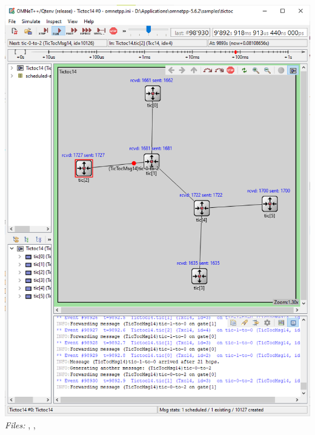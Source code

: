 \documentclass[conference]{IEEEtran}
\begin{document}
\includegraphics[scale=0.23]{images/tictoc14.ned.png}\break
\textit{Files:} , , 
\end{document}
